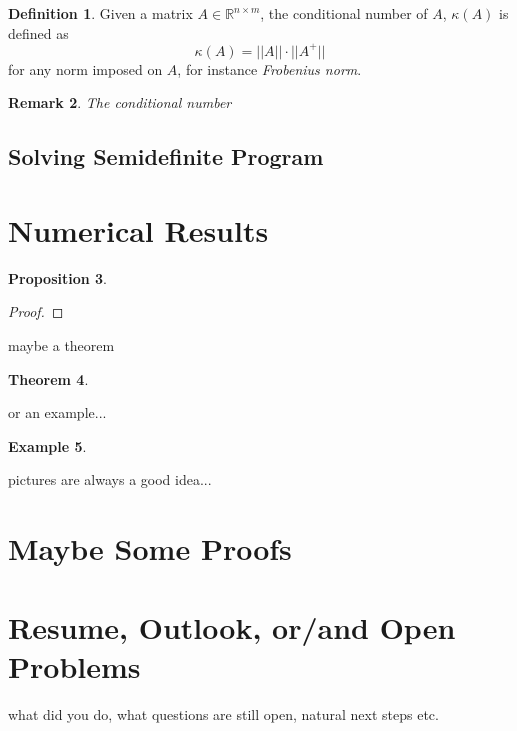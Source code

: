 \documentclass[12pt]{amsart}
\numberwithin{equation}{section}
\newtheorem{thm}{Theorem}
\newtheorem{prop}[thm]{Proposition}
\newtheorem{remark}[thm]{Remark}
\theoremstyle{definition}
\newtheorem{definition}[thm]{Definition}
\newtheorem{example}[thm]{Example}
\numberwithin{thm}{section}
\begin{document}
\begin{definition}
     Given a matrix $A \in \mathbb{R}^{n \times m}$, the conditional number of $A$, $\kappa(A)$ is defined as
     \begin{equation}
          \kappa(A) = ||A|| \cdot ||A^+||
     \end{equation}
     for any norm imposed on $A$, for instance \emph{Frobenius norm}.
\end{definition}

\begin{remark}
     The conditional number 
\end{remark}

\subsection{Solving Semidefinite Program}
\label{Sec:Solving Semidefinite Program}


\section{Numerical Results}


\begin{prop}

\end{prop}

\begin{proof}

\end{proof}

maybe a theorem


\begin{thm}

\end{thm}

or an example...
\begin{example}

\end{example}

pictures are always a good idea...



\section{Maybe Some Proofs}


\section{Resume, Outlook, or/and Open Problems}
\label{Sec:Outlook}


what did you do, what questions are still open, natural next steps etc. 





\end{document}
